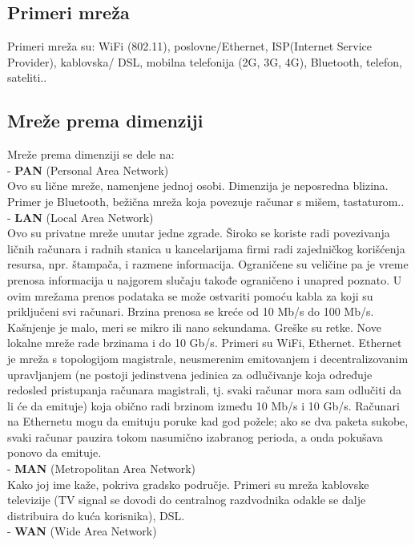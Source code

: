 \documentclass{article} %
\begin{document}
\subsection{Primeri mreža}
Primeri mreža su: WiFi (802.11), poslovne/Ethernet, ISP(Internet Service Provider), kablovska/ DSL, mobilna telefonija (2G, 3G, 4G), Bluetooth, telefon, sateliti.. 
\subsection{Mreže prema dimenziji}
Mreže prema dimenziji se dele na: \\
- \textbf{PAN} (Personal Area Network) \\
Ovo su lične mreže, namenjene jednoj osobi. Dimenzija je neposredna blizina. Primer je Bluetooth, bežična mreža koja povezuje računar s mišem, tastaturom.. \\
- \textbf{LAN} (Local Area Network)\\
Ovo su privatne mreže unutar jedne zgrade. Široko se koriste radi povezivanja ličnih računara i radnih stanica u kancelarijama firmi radi zajedničkog korišćenja resursa, npr. štampača, i razmene informacija. Ograničene su veličine pa je vreme prenosa informacija u najgorem slučaju takođe ograničeno i unapred poznato. U ovim mrežama prenos podataka se može ostvariti pomoću kabla za koji su priključeni svi računari. Brzina prenosa se kreće od 10 Mb/s do 100 Mb/s. Kašnjenje je malo, meri se mikro ili nano sekundama. Greške su retke. Nove lokalne mreže rade brzinama i do 10 Gb/s. 
Primeri su WiFi, Ethernet. Ethernet je mreža s topologijom magistrale, neusmerenim emitovanjem  i decentralizovanim upravljanjem (ne postoji jedinstvena jedinica za odlučivanje koja određuje redosled pristupanja računara magistrali, tj. svaki računar mora sam odlučiti da li će da emituje) koja obično radi brzinom između 10 Mb/s i 10 Gb/s. Računari na Ethernetu mogu da emituju poruke kad god požele; ako se dva paketa sukobe, svaki računar pauzira tokom nasumično izabranog perioda, a onda pokušava ponovo da emituje.\\
- \textbf{MAN} (Metropolitan Area Network) \\
Kako joj ime kaže, pokriva gradsko područje. Primeri su mreža kablovske televizije (TV signal se dovodi do centralnog razdvodnika odakle se dalje distribuira do kuća korisnika), DSL. \\
- \textbf{WAN} (Wide Area Network) \\
\end{document}
